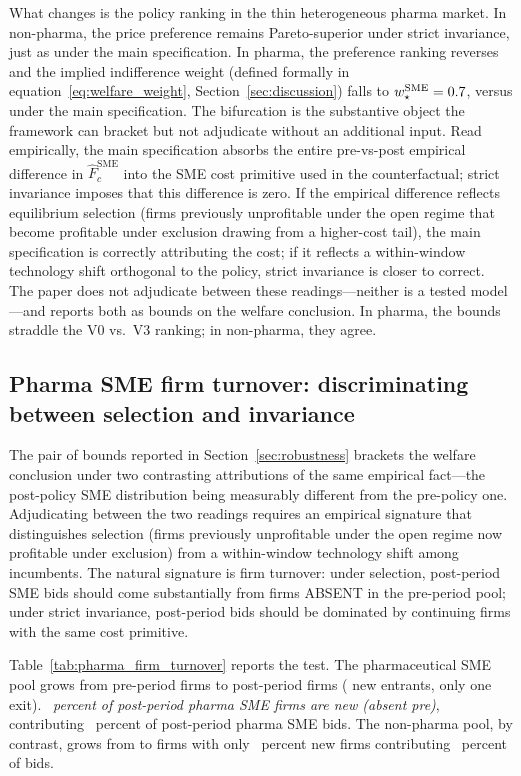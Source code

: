 What changes is the policy ranking in the thin heterogeneous pharma market. In non-pharma, the \optPrefThreshold{} price preference remains Pareto-superior under strict invariance, just as under the main specification. In pharma, the preference ranking reverses and the implied indifference weight (defined formally in equation~\eqref{eq:welfare_weight}, Section~\ref{sec:discussion}) falls to $w^{\text{SME}}_\star = 0.7$, versus \welfWeightMainPh{} under the main specification. The bifurcation is the substantive object the framework can bracket but not adjudicate without an additional input. Read empirically, the main specification absorbs the entire pre-vs-post empirical difference in $\hat F_c^{\text{SME}}$ into the SME cost primitive used in the counterfactual; strict invariance imposes that this difference is zero. If the empirical difference reflects equilibrium selection (firms previously unprofitable under the open regime that become profitable under exclusion drawing from a higher-cost tail), the main specification is correctly attributing the cost; if it reflects a within-window technology shift orthogonal to the policy, strict invariance is closer to correct. The paper does not adjudicate between these readings---neither is a tested model---and reports both as bounds on the welfare conclusion. In pharma, the bounds straddle the V0 vs.\ V3 ranking; in non-pharma, they agree.

\subsection{Pharma SME firm turnover: discriminating between selection and invariance}\label{sec:turnover}

The pair of bounds reported in Section~\ref{sec:robustness} brackets the welfare conclusion under two contrasting attributions of the same empirical fact---the post-policy SME distribution being measurably different from the pre-policy one. Adjudicating between the two readings requires an empirical signature that distinguishes selection (firms previously unprofitable under the open regime now profitable under exclusion) from a within-window technology shift among incumbents. The natural signature is firm turnover: under selection, post-period SME bids should come substantially from firms ABSENT in the pre-period pool; under strict invariance, post-period bids should be dominated by continuing firms with the same cost primitive.

Table~\ref{tab:pharma_firm_turnover} reports the test. The pharmaceutical SME pool grows from \turnoverPhNPre{} pre-period firms to \turnoverPhNPost{} post-period firms (\turnoverPhNNew{} new entrants, only one exit). \emph{\turnoverPhPctNewFirms~percent of post-period pharma SME firms are new (absent pre)}, contributing \turnoverPhPctNewBids~percent of post-period pharma SME bids. The non-pharma pool, by contrast, grows from \turnoverNpNPre{} to \turnoverNpNPost{} firms with only \turnoverNpPctNewFirms~percent new firms contributing \turnoverNpPctNewBids~percent of bids.

